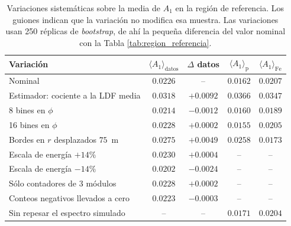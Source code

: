 \begin{table}[H]
	\centering
	\small
	\begin{tabular}{lcccc}
		\toprule
		Variación & $\langle A_1 \rangle_\mathrm{datos}$ & $\Delta$ datos & $\langle A_1 \rangle_\mathrm{p}$ & $\langle A_1 \rangle_\mathrm{Fe}$ \\
		\midrule
		Nominal & $0.0226$ & -- & $0.0162$ & $0.0207$ \\
		Estimador: cociente a la LDF media & $0.0318$ & $+0.0092$ & $0.0366$ & $0.0347$ \\
		8 bines en $\phi$ & $0.0214$ & $-0.0012$ & $0.0160$ & $0.0189$ \\
		16 bines en $\phi$ & $0.0228$ & $+0.0002$ & $0.0155$ & $0.0205$ \\
		Bordes en $r$ desplazados $75$~m & $0.0275$ & $+0.0049$ & $0.0258$ & $0.0173$ \\
		Escala de energía $+14\%$ & $0.0230$ & $+0.0004$ & -- & -- \\
		Escala de energía $-14\%$ & $0.0202$ & $-0.0024$ & -- & -- \\
		Sólo contadores de 3 módulos & $0.0228$ & $+0.0002$ & -- & -- \\
		Conteos negativos llevados a cero & $0.0223$ & $-0.0003$ & -- & -- \\
		Sin repesar el espectro simulado & -- & -- & $0.0171$ & $0.0204$ \\
		\bottomrule
	\end{tabular}
	\caption{Variaciones sistemáticas sobre la media de $A_1$ en la región de referencia. Los guiones indican que la variación no modifica esa muestra. Las variaciones usan 250 réplicas de \textit{bootstrap}, de ahí la pequeña diferencia del valor nominal con la Tabla \ref{tab:region_referencia}.}
	\label{tab:sistematicos}
\end{table}

